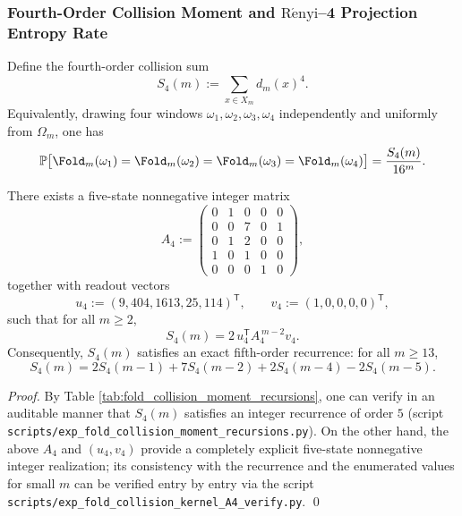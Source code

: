 \subsubsection{Fourth-Order Collision Moment and \texorpdfstring{$\mathrm{R\acute{e}nyi}$}{Renyi}--4 Projection Entropy Rate}\label{subsec:pom-s4}
\begin{definition}\label{def:pom-s4}
Define the fourth-order collision sum
$$
S_4(m):=\sum_{x\in X_m} d_m(x)^4.
$$
Equivalently, drawing four windows \(\omega_1,\omega_2,\omega_3,\omega_4\) independently and uniformly from \(\Omega_m\), one has
$$
\mathbb{P}\bigl[\Fold_m(\omega_1)=\Fold_m(\omega_2)=\Fold_m(\omega_3)=\Fold_m(\omega_4)\bigr]=\frac{S_4(m)}{16^m}.
$$
\end{definition}

\begin{proposition}\label{prop:pom-s4-recurrence}
There exists a five-state nonnegative integer matrix
$$
A_4:=
\begin{pmatrix}
0&1&0&0&0\\
0&0&7&0&1\\
0&1&2&0&0\\
1&0&1&0&0\\
0&0&0&1&0
\end{pmatrix},
$$
together with readout vectors
$$
u_4:=(9,404,1613,25,114)^{\mathsf T},\qquad
v_4:=(1,0,0,0,0)^{\mathsf T},
$$
such that for all \(m\ge 2\),
$$
S_4(m)=2\,u_4^{\mathsf T}A_4^{\,m-2}v_4.
$$
Consequently, \(S_4(m)\) satisfies an exact fifth-order recurrence: for all \(m\ge 13\),
$$
S_4(m)=2S_4(m-1)+7S_4(m-2)+2S_4(m-4)-2S_4(m-5).
$$
\end{proposition}
\begin{proof}
By Table \ref{tab:fold_collision_moment_recursions}, one can verify in an auditable manner that \(S_4(m)\) satisfies an integer recurrence of order \(5\) (script \texttt{scripts/exp\_fold\_collision\_moment\_recursions.py}). On the other hand, the above \(A_4\) and \((u_4,v_4)\) provide a completely explicit five-state nonnegative integer realization; its consistency with the recurrence and the enumerated values for small \(m\) can be verified entry by entry via the script \texttt{scripts/exp\_fold\_collision\_kernel\_A4\_verify.py}. \qed
\end{proof}

